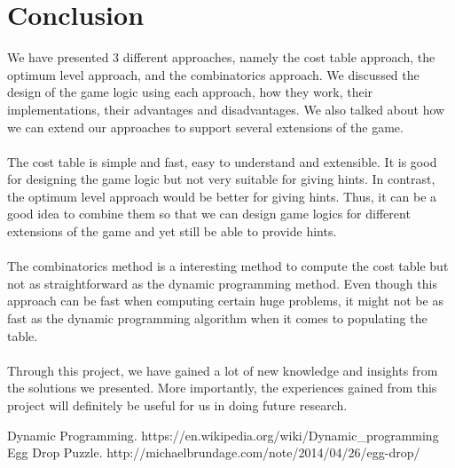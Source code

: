 \documentclass[12pt,a4paper,oneside]{report}
\begin{document}

\chapter{Conclusion}
We have presented 3 different approaches, namely the cost table approach, the optimum level approach, and the combinatorics approach. We discussed the design of the game logic using each approach, how they work, their implementations, their advantages and disadvantages. We also talked about how we can extend our approaches to support several extensions of the game. \\\\
The cost table is simple and fast, easy to understand and extensible. It is good for designing the game logic but not very suitable for giving hints. In contrast, the optimum level approach would be better for giving hints. Thus, it can be a good idea to combine them so that we can design game logics for different extensions of the game and yet still be able to provide hints. \\\\
The combinatorics method is a interesting method to compute the cost table but not as straightforward as the dynamic programming method. Even though this approach can be fast when computing certain huge problems, it might not be as fast as the dynamic programming algorithm when it comes to populating the table. \\\\
Through this project, we have gained a lot of new knowledge and insights from the solutions we presented. More importantly, the experiences gained from this project will definitely be useful for us in doing future research.


\renewcommand{\bibname}{References}
\begin{thebibliography}{1} 
	 Dynamic Programming. https://en.wikipedia.org/wiki/Dynamic\_programming
	 Egg Drop Puzzle. http://michaelbrundage.com/note/2014/04/26/egg-drop/
\end{thebibliography}

\end{document}

